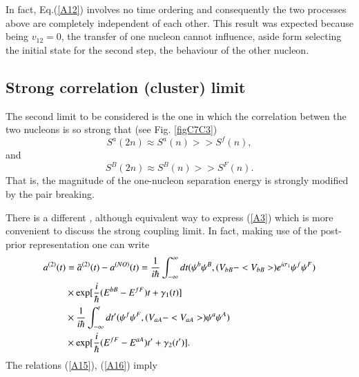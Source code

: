 In fact, Eq.(\ref{A12}) involves no time ordering and consequently the two processes above are completely independent of each other. 
This result was expected because being $v_{12}= 0$, the transfer of one nucleon cannot influence, aside form selecting the
initial state for the second step, the behaviour of the other nucleon.

\subsection{Strong correlation (cluster) limit}

The second limit to be considered is the one in which the correlation betwen the two nucleons is so strong that (see Fig. \ref{figC7C3})
\begin{equation}
S^a(2n) \approx S^a(n) >> S^f(n),
\label{A15}
\end{equation}
and 
\begin{equation}
S^B(2n) \approx S^B(n) >> S^F(n).
\label{A16}
\end{equation}
That is, the magnitude of the one-nucleon separation energy is strongly modified by the pair breaking.

There is a different , although equivalent way to express (\ref{A3}) which is  more convenient to discuss the strong coupling limit.
In fact, making use of the post-prior representation one can write
\begin{eqnarray}
a^{(2)}(t) &= \tilde a^{(2)}(t) - a^{(NO)}(t) = 
\frac{1}{i \hbar} \int^{\infty}_{-\infty} dt (\psi^b \psi^B, (V_{bB} - <V_{bB}>) e^{i \sigma_1} \psi^f \psi^F ) \nonumber \\ 
&\times {\rm exp} [\frac{i}{\hbar} (E^{bB} - E^{fF}) t + \gamma_1(t)]  \nonumber  \\
&\nonumber\times\frac{1}{i \hbar} \int^{t}_{-\infty} dt' (\psi^f \psi^F, (V_{aA} - <V_{aA}>) \psi^a \psi^A )\\
& \times 
{\rm exp} [\frac{i}{\hbar} (E^{fF} - E^{aA}) t' + \gamma_2(t')].
\end{eqnarray}
The relations  (\ref{A15}), (\ref{A16}) imply 


